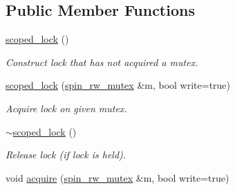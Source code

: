 \subsection*{Public Member Functions}
\begin{DoxyCompactItemize}
\item 
\hyperlink{classtbb_1_1spin__rw__mutex__v3_1_1scoped__lock_a285b355121772c874a7ecaaf4d347224}{scoped\+\_\+lock} ()
\begin{DoxyCompactList}\small\item\em Construct lock that has not acquired a mutex. \end{DoxyCompactList}\item 
\hypertarget{classtbb_1_1spin__rw__mutex__v3_1_1scoped__lock_a0a2e15358575f7651446bca13a5a2674}{}\hyperlink{classtbb_1_1spin__rw__mutex__v3_1_1scoped__lock_a0a2e15358575f7651446bca13a5a2674}{scoped\+\_\+lock} (\hyperlink{classtbb_1_1spin__rw__mutex}{spin\+\_\+rw\+\_\+mutex} \&m, bool write=true)\label{classtbb_1_1spin__rw__mutex__v3_1_1scoped__lock_a0a2e15358575f7651446bca13a5a2674}

\begin{DoxyCompactList}\small\item\em Acquire lock on given mutex. \end{DoxyCompactList}\item 
\hypertarget{classtbb_1_1spin__rw__mutex__v3_1_1scoped__lock_a5c27ca2e0c9db960a9a7430082ff7edd}{}\hyperlink{classtbb_1_1spin__rw__mutex__v3_1_1scoped__lock_a5c27ca2e0c9db960a9a7430082ff7edd}{$\sim$scoped\+\_\+lock} ()\label{classtbb_1_1spin__rw__mutex__v3_1_1scoped__lock_a5c27ca2e0c9db960a9a7430082ff7edd}

\begin{DoxyCompactList}\small\item\em Release lock (if lock is held). \end{DoxyCompactList}\item 
\hypertarget{classtbb_1_1spin__rw__mutex__v3_1_1scoped__lock_a6d49df365396ab314e78ba07c6b96433}{}void \hyperlink{classtbb_1_1spin__rw__mutex__v3_1_1scoped__lock_a6d49df365396ab314e78ba07c6b96433}{acquire} (\hyperlink{classtbb_1_1spin__rw__mutex}{spin\+\_\+rw\+\_\+mutex} \&m, bool write=true)\label{classtbb_1_1spin__rw__mutex__v3_1_1scoped__lock_a6d49df365396ab314e78ba07c6b96433}


\end{DoxyCompactItemize}
